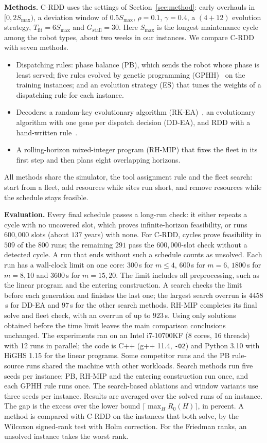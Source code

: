 \textbf{Methods.}
C-RDD uses the settings of Section~\ref{sec:method}: early overhauls in $[0, 2S_{\max})$, a deviation window of $0.5 S_{\max}$, $\rho = 0.1$, $\gamma = 0.4$, a $(4 + 12)$ evolution strategy, $T_{\mathrm{fit}} = 6 S_{\max}$ and $G_{\mathrm{stall}} = 30$.
Here $S_{\max}$ is the longest maintenance cycle among the robot types, about two weeks in our instances.
We compare C-RDD with seven methods.
\begin{itemize}
  \item Dispatching rules: phase balance (PB), which sends the robot whose phase is least served; five rules evolved by genetic programming (GPHH)~\cite{zhang2024survey} on the training instances; and an evolution strategy (ES) that tunes the weights of a dispatching rule for each instance.
  \item Decoders: a random-key evolutionary algorithm (RK-EA)~\cite{londe2025brkga}, an evolutionary algorithm with one gene per dispatch decision (DD-EA), and RDD with a hand-written rule~\cite{rdd}.
  \item A rolling-horizon mixed-integer program (RH-MIP) that fixes the fleet in its first step and then plans eight overlapping horizons.
\end{itemize}
All methods share the simulator, the tool assignment rule and the fleet search: start from a fleet, add resources while sites run short, and remove resources while the schedule stays feasible.

\textbf{Evaluation.}
Every final schedule passes a long-run check: it either repeats a cycle with no uncovered slot, which proves infinite-horizon feasibility, or runs $600{,}000$ slots (about $137$ years) with none.
For C-RDD, cycles prove feasibility in $509$ of the $800$ runs; the remaining $291$ pass the $600{,}000$-slot check without a detected cycle.
A run that ends without such a schedule counts as unsolved.
Each run has a wall-clock limit on one core: $300$\,s for $m \le 4$, $600$\,s for $m = 6$, $1800$\,s for $m = 8, 10$ and $3600$\,s for $m = 15, 20$.
The limit includes all preprocessing, such as the linear program and the entering construction.
A search checks the limit before each generation and finishes the last one; the largest search overrun is $4458$\,s for DD-EA and $97$\,s for the other search methods.
RH-MIP completes its final solve and fleet check, with an overrun of up to $923$\,s.
Using only solutions obtained before the time limit leaves the main comparison conclusions unchanged.
The experiments ran on an Intel i7-10700KF (8 cores, 16 threads) with 12 runs in parallel; the code is C++ (g++ 11.4, \texttt{-O2}) and Python 3.10 with HiGHS 1.15 for the linear programs.
Some competitor runs and the PB rule-source runs shared the machine with other workloads.
Search methods run five seeds per instance; PB, RH-MIP and the entering construction run once, and each GPHH rule runs once.
The search-based ablations and window variants use three seeds per instance.
Results are averaged over the solved runs of an instance.
The gap is the excess over the lower bound $\lceil \max_H R_0(H) \rceil$, in percent.
A method is compared with C-RDD on the instances that both solve, by the Wilcoxon signed-rank test with Holm correction.
For the Friedman ranks, an unsolved instance takes the worst rank.

